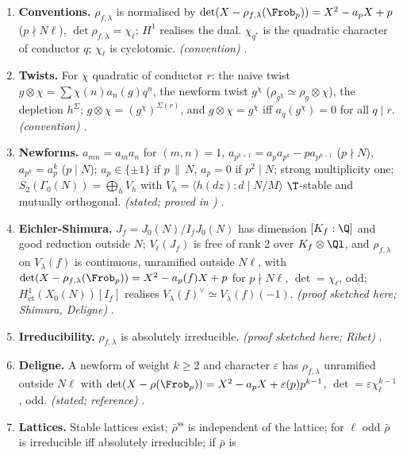 \begin{enumerate}[label=\textbf{\thechapter.\arabic*}]
\item \textbf{Conventions.} $\rho_{f,\lambda}$ is normalised by $\det(X-\rho_{f,\lambda}(\Frob_p))=X^2-a_pX+p$ ($p\nmid N\ell$), $\det\rho_{f,\lambda}=\chi_\ell$; $H^1$ realises the dual. $\chi_{q^*}$ is the quadratic
character of conductor $q$; $\chi_\ell$ is cyclotomic. \emph{(convention)} .
\item \textbf{Twists.} For $\chi$ quadratic of conductor $r$: the naive twist $g\otimes\chi=\sum\chi(n)a_n(g)q^n$, the newform twist $g^\chi$ ($\rho_{g^\chi}\simeq\rho_g\otimes\chi$), the depletion $h^\Sigma$;
$g\otimes\chi=(g^\chi)^{\Sigma(r)}$, and $g\otimes\chi=g^\chi$ iff $a_q(g^\chi)=0$ for all $q\mid r$. \emph{(convention)} .
\item \textbf{Newforms.} $a_{mn}=a_ma_n$ for $(m,n)=1$, $a_{p^{k+1}}=a_pa_{p^k}-pa_{p^{k-1}}$ ($p\nmid N$), $a_{p^k}=a_p^k$ ($p\mid N$); $a_p\in\{\pm1\}$ if $p\,\|\,N$, $a_p=0$ if $p^2\mid N$;
strong multiplicity one; $S_2(\Gamma_0(N))=\bigoplus_h V_h$ with $V_h=\langle h(dz):d\mid N/M\rangle$ $\T$-stable and mutually orthogonal. \emph{(stated; proved in )}
.
\item \textbf{Eichler-Shimura.} $J_f=J_0(N)/I_fJ_0(N)$ has dimension $[K_f:\Q]$ and good reduction outside $N$; $V_\ell(J_f)$ is free of rank $2$ over $K_f\otimes\Ql$, and
$\rho_{f,\lambda}$ on $V_\lambda(f)$ is continuous, unramified outside $N\ell$, with $\det(X-\rho_{f,\lambda}(\Frob_p))=X^2-a_p(f)X+p$ for $p\nmid N\ell$, $\det=\chi_\ell$, odd; $H^1_{\mathrm{et}}(X_0(N))[I_f]$ realises
$V_\lambda(f)^\vee\simeq V_\lambda(f)(-1)$. \emph{(proof sketched here; Shimura, Deligne)} .
\item \textbf{Irreducibility.} $\rho_{f,\lambda}$ is absolutely irreducible. \emph{(proof sketched here; Ribet)} .
\item \textbf{Deligne.} A newform of weight $k\ge2$ and character $\varepsilon$ has $\rho_{f,\lambda}$ unramified outside $N\ell$ with $\det(X-\rho(\Frob_p))=X^2-a_pX+\varepsilon(p)p^{k-1}$, $\det=\varepsilon\chi_\ell^{k-1}$,
odd. \emph{(stated; reference)} .
\item \textbf{Lattices.} Stable lattices exist; $\bar\rho^{\mathrm{ss}}$ is independent of the lattice; for $\ell$ odd $\bar\rho$ is irreducible iff absolutely irreducible; if $\bar\rho$ is

\end{enumerate}
